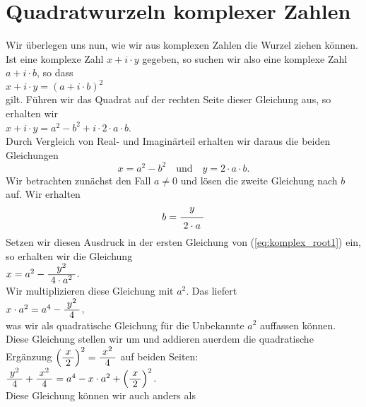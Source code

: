 \section{Quadratwurzeln komplexer Zahlen}
Wir \"{u}berlegen uns nun, wie wir aus komplexen Zahlen die Wurzel ziehen k\"{o}nnen.  Ist eine komplexe Zahl
$x + i \cdot y$ gegeben, so suchen wir also eine komplexe Zahl $a + i \cdot b$, so dass
\\[0.2cm]
\hspace*{1.3cm}
$x + i \cdot y = (a + i \cdot b)^2$
\\[0.2cm]
gilt.  F\"{u}hren wir das Quadrat auf der rechten Seite dieser Gleichung aus, so erhalten wir
\\[0.2cm]
\hspace*{1.3cm}
$x + i \cdot y = a^2 - b^2 + i \cdot 2 \cdot a \cdot b$.
\\[0.2cm]
Durch Vergleich von Real- und Imagin\"{a}rteil erhalten wir daraus die beiden Gleichungen
\begin{equation}
  \label{eq:komplex_root1}
  x = a^2 - b^2 \quad \mbox{und} \quad y = 2 \cdot a \cdot b.
\end{equation}
Wir betrachten zun\"{a}chst den Fall $a \not= 0$ und
l\"{o}sen die zweite Gleichung nach $b$ auf.  Wir erhalten
\begin{equation}
  \label{eq:komplex_root2}
  b = \bruch{y}{2 \cdot a}  
\end{equation}
Setzen wir diesen Ausdruck in der ersten Gleichung von (\ref{eq:komplex_root1}) ein, so erhalten wir die
Gleichung 
\\[0.2cm]
\hspace*{1.3cm}
$x = a^2 - \bruch{y^2}{4 \cdot a^2}$.
\\[0.2cm]
Wir multiplizieren diese Gleichung mit $a^2$. Das liefert 
\\[0.2cm]
\hspace*{1.3cm}
$x \cdot a^2 = a^4 - \bruch{y^2}{4}$,
\\[0.2cm] 
was wir als quadratische Gleichung f\"{u}r die  Unbekannte $a^2$ auffassen k\"{o}nnen.
 Diese Gleichung stellen wir um und addieren au\3erdem die quadratische Erg\"{a}nzung 
$\left(\bruch{x}{2}\right)^2 = \bruch{x^2}{4}$ auf 
beiden Seiten: 
\\[0.2cm]
\hspace*{1.3cm}
$\bruch{y^2}{4} + \bruch{x^2}{4} = a^4 - x \cdot a^2 + \left(\bruch{x}{2}\right)^2$.
\\[0.2cm]
Diese Gleichung k\"{o}nnen wir auch anders als
\\[0.2cm]
